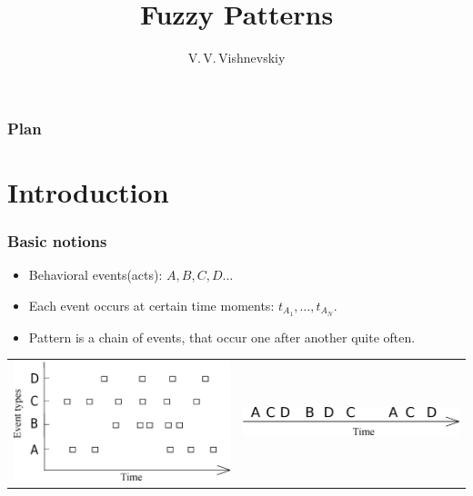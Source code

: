 \documentclass[smaller]{beamer}
\title{Fuzzy Patterns} %
\author %
{V.\,V.\,Vishnevskiy\inst{1}}
\institute[Moscow State University] %
{
  \inst{1}
  Moscow State University
}
\date[Patterns] %
{}
\begin{document}
\begin{frame}
  \titlepage
\end{frame}

\begin{frame}
  \frametitle{Plan}
  \tableofcontents
\end{frame}



\section{Introduction}

\begin{frame}	
  \frametitle{Basic notions}
\begin{itemize}
  \item Behavioral events(acts): $A,B,C,D\dots$
  \item Each event occurs at certain time moments: $t_{A_1},\dots,t_{A_N}$. 
  \item Pattern is a chain of events, that occur one after another quite often.
\end{itemize}

\begin{left}
\begin{tabular}[t]{p{12em}|p{12em}}
    \includegraphics[scale=0.25]{NEWTS.eps} & \includegraphics[scale=0.25]{TSNEW2.eps}\\
\end{tabular}
\end{left}


\end{frame}
\end{document}
